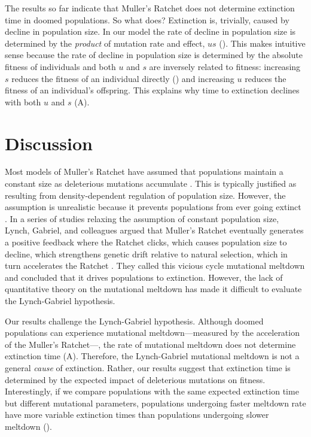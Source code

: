 \documentclass[9pt,lineno]{elife}
\begin{document}
The results so far indicate that Muller's Ratchet does not determine extinction time in doomed populations.  So what does?
%
Extinction is, trivially, caused by decline in population size.  In our model the rate of decline in population size is determined by the \textit{product} of mutation rate and effect, $us$ ().  This makes intuitive sense because the rate of decline in population size is determined by the absolute fitness of individuals and both $u$ and $s$ are inversely related to fitness: 
increasing $s$ reduces the fitness of an individual directly () and increasing $u$ reduces the fitness of an individual's offspring.
%
This explains why time to extinction declines with both $u$ and $s$ (A).




\section{Discussion}




Most models of Muller's Ratchet have assumed that populations maintain a constant size as deleterious mutations accumulate \citep{Haigh_The_1978, Gessler_The_1995, Gordo_On_2000, gor00b, Rouzine_The_2003, met13}.
This is typically justified as resulting from density-dependent regulation of population size.  
However, the assumption is unrealistic because it prevents populations from ever going extinct \citep{Lynch_MUTATION_1990, mel91}.  
%
In a series of studies relaxing the assumption of constant population size, Lynch, Gabriel, and colleagues argued that Muller's Ratchet eventually generates a positive feedback where
the Ratchet clicks, 
which causes population size to decline, 
which strengthens genetic drift relative to natural selection,
which in turn accelerates the Ratchet \citep{Lynch_MUTATION_1990, lyn93, Gabriel_MULLER_1993}.  
They called this vicious cycle mutational meltdown and concluded that it drives populations to extinction.  
However, the lack of quantitative theory on the mutational meltdown has made it difficult to evaluate the Lynch-Gabriel hypothesis.

Our results challenge the Lynch-Gabriel hypothesis.  Although doomed populations can experience mutational meltdown---measured by the acceleration of the Muller's Ratchet---, the rate of mutational meltdown does not determine extinction time (A).  Therefore, the Lynch-Gabriel mutational meltdown is not a general \textit{cause} of extinction.  Rather, our results suggest that extinction time is determined by the expected impact of deleterious mutations on fitness.  
Interestingly, if we compare populations with the same expected extinction time but different mutational parameters, populations undergoing faster meltdown rate have more variable extinction times than populations undergoing slower meltdown  ().
\end{document}
